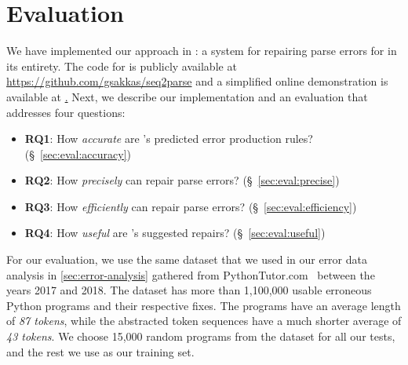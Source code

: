 \section{Evaluation}
\label{sec:eval}

We have implemented our approach in \toolname: a system for repairing parse
errors for \python in its entirety. The code for \toolname is publicly available
at \url{https://github.com/gsakkas/seq2parse} and a simplified online
demonstration is available at
\href{http://seq2parse.goto.ucsd.edu/index.html}. Next, we
describe our implementation and an evaluation that addresses four questions:

\begin{itemize}
    \item \textbf{RQ1}: How \emph{accurate} are \toolname's predicted error production rules?
                        (\S~\ref{sec:eval:accuracy})
    \item \textbf{RQ2}: How \emph{precisely} can \toolname repair parse errors?
                        (\S~\ref{sec:eval:precise})
    \item \textbf{RQ3}: How \emph{efficiently} can \toolname repair parse errors?
                        (\S~\ref{sec:eval:efficiency})
    \item \textbf{RQ4}: How \emph{useful} are \toolname's suggested repairs?
                        (\S~\ref{sec:eval:useful})
\end{itemize}


For our evaluation, we use the same \python dataset that we used in our error
data analysis in \autoref{sec:error-analysis} gathered from
PythonTutor.com~\citep{Guo2013} between the years 2017 and 2018. The dataset has
more than 1,100,000 usable erroneous Python programs and their respective fixes.
The programs have an average length of \emph{87 tokens}, while the abstracted
token sequences have a much shorter average of \emph{43 tokens}. We choose
15,000 random programs from the dataset for all our tests, and the rest we use
as our training set.

